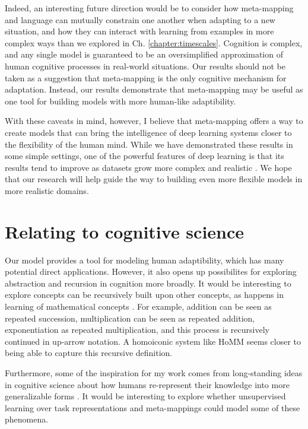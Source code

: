 Indeed, an interesting future direction would be to consider how meta-mapping and language can mutually constrain one another when adapting to a new situation, and how they can interact with learning from examples in more complex ways than we explored in Ch. \ref{chapter:timescales}. Cognition is complex, and any single model is guaranteed to be an oversimplified approximation of human cognitive processes in real-world situations. Our results should not be taken as a suggestion that meta-mapping is the only cognitive mechanism for adaptation. Instead, our results demonstrate that meta-mapping may be useful as one tool for building models with more human-like adaptibility. \par
With these caveats in mind, however, I believe that meta-mapping offers a way to create models that can bring the intelligence of deep learning systems closer to the flexibility of the human mind. While we have demonstrated these results in some simple settings, one of the powerful features of deep learning is that its results tend to improve as datasets grow more complex and realistic \citep{Hill2019a}. We hope that our research will help guide the way to building even more flexible models in more realistic domains. 

\section{Relating to cognitive science}

Our model provides a tool for modeling human adaptibility, which has many potential direct applications. However, it also opens up possibilites for exploring abstraction and recursion in cognition more broadly. It would be interesting to explore concepts can be recursively built upon other concepts, as happens in learning of mathematical concepts \citep{Wilensky1991, Hazzan1999, Lampinen2017b}. For example, addition can be seen as repeated succession, multiplication can be seen as repeated addition, exponentiation as repeated multiplication, and this process is recursively continued in up-arrow notation. A homoiconic system like HoMM seems closer to being able to capture this recursive definition. \par 
Furthermore, some of the inspiration for my work comes from long-standing ideas in cognitive science about how humans re-represent their knowledge into more generalizable forms \citep{Karmiloff-Smith1986,Clark1993}. It would be interesting to explore whether unsupervised learning over task representations and meta-mappings could model some of these phenomena.\par 

